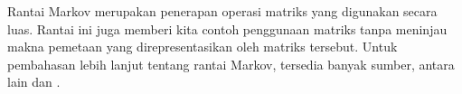 \begin{center}
\begin{tabular}{@{}r|c@{\markovspacer}c@{\markovspacer}c@{\markovspacer}c@{\markovspacer}c@{\markovspacer}c@{\markovspacer}c@{\markovspacer}c@{}}
\end{tabular}
\end{center}

Rantai Markov merupakan penerapan operasi matriks yang digunakan secara luas.
Rantai ini juga memberi kita contoh penggunaan matriks tanpa meninjau makna
pemetaan yang direpresentasikan oleh matriks tersebut.
Untuk pembahasan lebih lanjut tentang rantai Markov, tersedia banyak sumber,
antara lain \cite{KemenySnell} dan \cite{Iosifescu}.

